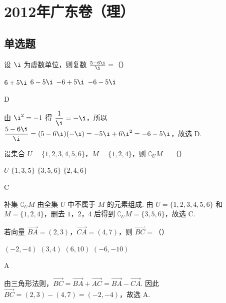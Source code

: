 \chapter{2012年广东卷（理）}

\section{单选题}

\begin{problem}
设 \(\i\) 为虚数单位，则复数 \(\frac{5 - 6\i}{\i}=\)（\quad）

\choices
    {\(6 + 5\i\)}
    {\(6 - 5\i\)}
    {\(-6 + 5\i\)}
    {\(-6 - 5\i\)}
\end{problem}

\begin{answer}
D
\end{answer}

\begin{solution}
由 \(\i^2=-1\) 得 \(\dfrac{1}{\i}=-\i\)，所以
\(\dfrac{5-6\i}{\i}=(5-6\i)(-\i)=-5\i+6\i^2=-6-5\i\)，故选 D.
\end{solution}

\begin{problem}
设集合 \(U = \{1, 2, 3, 4, 5, 6\}\)，\(M = \{1, 2, 4\}\)，则 \(\complement_U M =\)（\quad）

\choices
    {\(U\)}
    {\(\{1, 3, 5\}\)}
    {\(\{3, 5, 6\}\)}
    {\(\{2, 4, 6\}\)}
\end{problem}

\begin{answer}
C
\end{answer}

\begin{solution}
补集 \(\complement_U M\) 由全集 \(U\) 中不属于 \(M\) 的元素组成. 由 \(U=\{1,2,3,4,5,6\}\) 和 \(M=\{1,2,4\}\)，删去 \(1\)，\(2\)，\(4\) 后得到 \(\complement_U M=\{3,5,6\}\)，故选 C.
\end{solution}

\begin{problem}
若向量 \(\overrightarrow{BA} = (2, 3)\)，\(\overrightarrow{CA} = (4, 7)\)，则 \(\overrightarrow{BC} =\)（\quad）

\choices
    {\((-2, -4)\)}
    {\((3, 4)\)}
    {\((6, 10)\)}
    {\((-6, -10)\)}
\end{problem}

\begin{answer}
A
\end{answer}

\begin{solution}
由三角形法则，\(\overrightarrow{BC}=\overrightarrow{BA}+\overrightarrow{AC}=\overrightarrow{BA}-\overrightarrow{CA}\). 因此
\(\overrightarrow{BC}=(2,3)-(4,7)=(-2,-4)\)，故选 A.
\end{solution}

